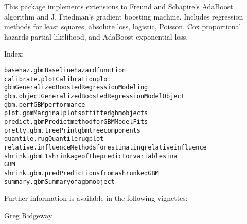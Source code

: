 \begin{Description}\relax
This package implements extensions to Freund and
Schapire's AdaBoost algorithm and J. Friedman's gradient
boosting machine. Includes regression methods for least
squares, absolute loss, logistic, Poisson, Cox proportional
hazards partial likelihood, and AdaBoost exponential loss.
\end{Description}
\begin{Details}\relax
{}

Index:
\begin{alltt}
basehaz.gbm             Baseline hazard function
calibrate.plot          Calibration plot
gbm                     Generalized Boosted Regression Modeling
gbm.object              Generalized Boosted Regression Model Object
gbm.perf                GBM performance
plot.gbm                Marginal plots of fitted gbm objects
predict.gbm             Predict method for GBM Model Fits
pretty.gbm.tree         Print gbm tree components
quantile.rug            Quantile rug plot
relative.influence      Methods for estimating relative influence
shrink.gbm              L1 shrinkage of the predictor variables in a
                        GBM
shrink.gbm.pred         Predictions from a shrunked GBM
summary.gbm             Summary of a gbm object
\end{alltt}

Further information is available in the following vignettes:
\end{Details}
\begin{Author}\relax
Greg Ridgeway 
\end{Author}
